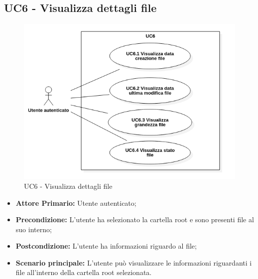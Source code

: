 \subsection{UC6 - Visualizza dettagli file}
\begin{figure}[H]
    \centering
    \includegraphics[scale = 0.7]{components/img/UC6.png}
    \caption{UC6 - Visualizza dettagli file}
\end{figure}
\begin{itemize}
\item \textbf{Attore Primario:} Utente autenticato;
\item \textbf{Precondizione:} L'utente ha selezionato la cartella root e sono presenti file al suo interno;
\item \textbf{Postcondizione:} L'utente ha informazioni riguardo al file;
\item \textbf{Scenario principale:} L'utente può visualizzare le informazioni riguardanti i file all'interno della cartella root selezionata.
\end{itemize}